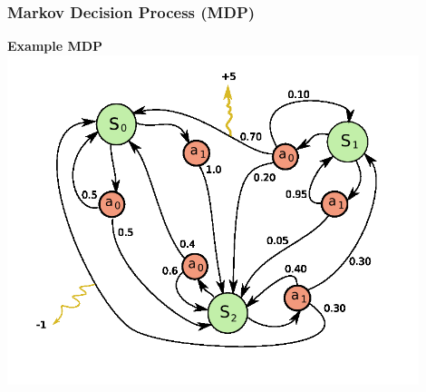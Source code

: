 \begin{frame}
  \frametitle{Markov Decision Process (MDP)}
  \begin{center}
  \textbf{Example MDP}
        \includegraphics[width=0.9\textwidth]{Markov_Decision_Process_example.png}
  \end{center}
\end{frame}



